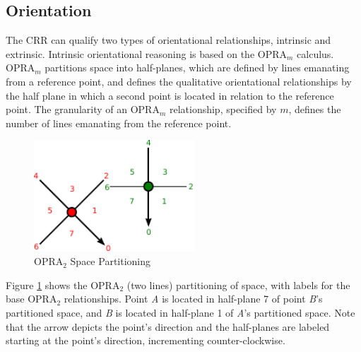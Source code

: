 \documentclass[12pt]{ucthesis}
\begin{document}


\subsection{Orientation} \label{orientation}
The CRR can qualify two types of orientational relationships, intrinsic and extrinsic. Intrinsic orientational reasoning is based on the OPRA$_{m}$ calculus. OPRA$_{m}$ partitions space into half-planes, which are defined by lines emanating from a reference point, and defines the qualitative orientational relationships by the half plane in which a second point is located in relation to the reference point. The granularity of an OPRA$_{m}$ relationship, specified by $m$, defines the number of lines emanating from the reference point. 

\begin{figure}[H]
\centering
\includegraphics[width=60mm]{facing-opra-base-rel}
\caption{OPRA$_{2}$ Space Partitioning}
\label{facing-opra-base-rel}
\end{figure}

Figure \ref{facing-opra-base-rel} shows the OPRA$_{2}$ (two lines) partitioning of space, with labels for the base OPRA$_{2}$ relationships. Point \emph{A} is located in half-plane 7 of point \emph{B}'s partitioned space, and \emph{B} is located in half-plane 1 of \emph{A}'s partitioned space. Note that the arrow depicts the point's direction and the half-planes are labeled starting at the point's direction, incrementing counter-clockwise. 
\end{document}
